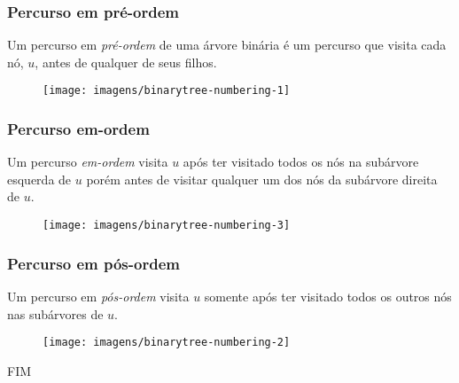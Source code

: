 \documentclass{beamer}
\begin{document}
\begin{frame}[shrink]
\frametitle{Percurso em pré-ordem}
Um percurso em \emph{pré-ordem}  de uma árvore binária é um percurso que visita cada nó, \ensuremath{\ensuremath{\ensuremath{\mathit{u}}}}, antes de qualquer de seus filhos.
\begin{figure}
  \begin{center}
    \texttt{[image: imagens/binarytree-numbering-1]}
  \end{center}
\end{figure}

\end{frame}

\begin{frame}[shrink]
\frametitle{Percurso em-ordem}
Um percurso \emph{em-ordem} 
visita \ensuremath{\ensuremath{\ensuremath{\mathit{u}}}} após ter visitado todos os nós na subárvore esquerda de \ensuremath{\ensuremath{\ensuremath{\mathit{u}}}} porém antes de visitar qualquer um dos nós da subárvore direita de \ensuremath{\ensuremath{\ensuremath{\mathit{u}}}}.
\begin{figure}
  \begin{center}
    \texttt{[image: imagens/binarytree-numbering-3]} \\[2ex]
  \end{center}
\end{figure}

\end{frame}
\begin{frame}[shrink]
\frametitle{Percurso em pós-ordem}
Um percurso em \emph{pós-ordem} visita \ensuremath{\ensuremath{\ensuremath{\mathit{u}}}} somente após ter visitado todos os outros nós nas subárvores de \ensuremath{\ensuremath{\ensuremath{\mathit{u}}}}.
\begin{figure}
  \begin{center}
    \texttt{[image: imagens/binarytree-numbering-2]}
  \end{center}
\end{figure}

\end{frame}

\begin{frame}
FIM
\end{frame}
\end{document}
